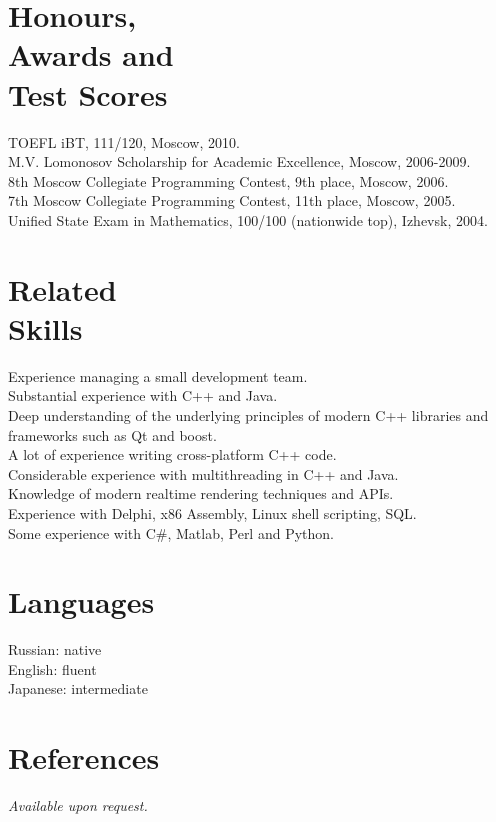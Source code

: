 \documentclass[margin,line]{CV}
\begin{document}
\begin{resume}
    \section{\mysidestyle Honours, \\Awards and \\Test Scores}
    TOEFL iBT, 111/120, Moscow, 2010.                                                               \vspace{1mm}\\%
    M.V. Lomonosov Scholarship for Academic Excellence, Moscow, 2006-2009.                          \vspace{1mm}\\%
    8th Moscow Collegiate Programming Contest, 9th place, Moscow, 2006.                             \vspace{1mm}\\%
    7th Moscow Collegiate Programming Contest, 11th place, Moscow, 2005.                            \vspace{1mm}\\%
    Unified State Exam in Mathematics, 100/100 (nationwide top), Izhevsk, 2004.                     \vspace{1mm}\\%

    \section{\mysidestyle Related\\Skills}
	Experience managing a small development team. \\
    Substantial experience with C++ and Java. \\
	Deep understanding of the underlying principles of modern C++ libraries and frameworks such as Qt and boost. \\
    A lot of experience writing cross-platform C++ code. \\
    Considerable experience with multithreading in C++ and Java. \\
    Knowledge of modern realtime rendering techniques and APIs. \\
    Experience with Delphi, x86 Assembly, Linux shell scripting, SQL. \\
    Some experience with C\#, Matlab, Perl and Python. \\


    \section{\mysidestyle Languages}
    Russian: native \\
    English: fluent \\
    Japanese: intermediate


    \section{\mysidestyle References}
    {\sl Available upon request.}

\end{resume}
\end{document}
